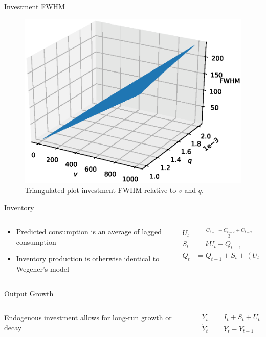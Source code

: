 \documentclass{beamer}
\begin{document}
\begin{frame}{Investment FWHM}
	\begin{figure}
		\centering
		\includegraphics[height=0.8\textheight]{widthinvestment.eps}
		\caption{Triangulated plot investment FWHM relative to $v$ and $q$.}
	\end{figure}
\end{frame}

\begin{frame}{Inventory}
	\begin{columns}
	\begin{column}{0.5\textwidth}
		\begin{itemize}
			\item Predicted consumption is an average of lagged consumption
			\item Inventory production is otherwise identical to Wegener's model
		\end{itemize}
	\end{column}
	\begin{column}{0.5\textwidth}
		\begin{align*}
			U_t &= \frac{C_{t-1}+C_{t-2}+C_{t-2}}{3}\\
			S_t &= kU_t-Q_{t-1}\\
			Q_t &= Q_{t-1} + S_t + (U_t-C_t)
		\end{align*}
	\end{column}
	\end{columns}
\end{frame}

\begin{frame}{Output Growth}
	\begin{columns}
	\begin{column}{0.5\textwidth}
		Endogenous investment allows for long-run growth or decay 
	\end{column}
	\begin{column}{0.5\textwidth}
		\begin{align*}
			Y_t &= I_t + S_t + U_t\\
			\dot Y_t &= Y_{t}-Y_{t-1}
		\end{align*}
	\end{column}
	\end{columns}
\end{frame}
\end{document}
